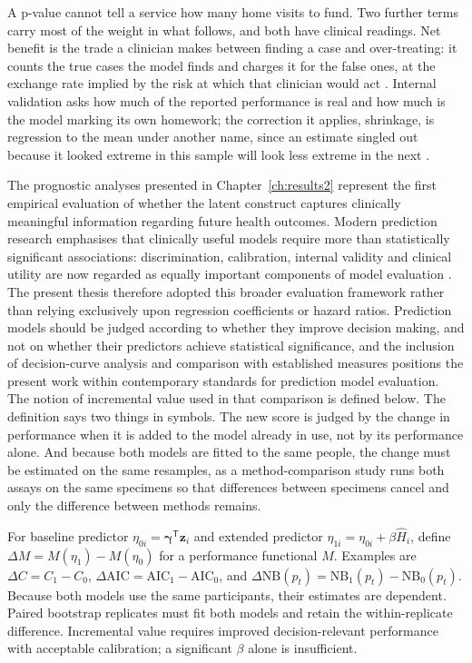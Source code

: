 A p-value cannot tell a service how many home visits to fund. Two further terms
carry most of the weight in what follows, and both have clinical readings. Net
benefit is the trade a clinician makes between finding a case and over-treating:
it counts the true cases the model finds and charges it for the false ones, at
the exchange rate implied by the risk at which that clinician would act
\citep{vickers_elkin_2006}. Internal validation asks how much of the reported
performance is real and how much is the model marking its own homework; the
correction it applies, shrinkage, is regression to the mean under another name,
since an estimate singled out because it looked extreme in this sample will look
less extreme in the next \citep{harrell_1996,steyerberg_2019}.

The prognostic analyses presented in Chapter~\ref{ch:results2} represent the first empirical evaluation of whether the latent construct captures clinically meaningful information regarding future health outcomes. Modern prediction research emphasises that clinically useful models require more than statistically significant associations: discrimination, calibration, internal validity and clinical utility are now regarded as equally important components of model evaluation \citep{steyerberg_2019,vancalster_2019}. The present thesis therefore adopted this broader evaluation framework rather than relying exclusively upon regression coefficients or hazard ratios. Prediction models should be judged according to whether they improve decision making, and not on whether their predictors achieve statistical significance, and the inclusion of decision-curve analysis and comparison with established measures positions the present work within contemporary standards for prediction model evaluation. The notion of incremental value used in that comparison is defined below. The definition says two things in symbols. The new score is judged by the change in performance when it is added to the model already in use, not by its performance alone. And because both models are fitted to the same people, the change must be estimated on the same resamples, as a method-comparison study runs both assays on the same specimens so that differences between specimens cancel and only the difference between methods remains.

\begin{derivation}
\label{der:incremental}
For baseline predictor $\eta_{0i}=\boldsymbol\gamma^{\mathsf T}\mathbf z_i$ and
extended predictor $\eta_{1i}=\eta_{0i}+\beta\widehat H_i$, define
$\Delta M=M(\eta_1)-M(\eta_0)$ for a performance functional $M$. Examples are
$\Delta C=C_1-C_0$, $\Delta\mathrm{AIC}=\mathrm{AIC}_1-\mathrm{AIC}_0$, and
$\Delta\mathrm{NB}(p_t)=\mathrm{NB}_1(p_t)-\mathrm{NB}_0(p_t)$. Because both
models use the same participants, their estimates are dependent. Paired bootstrap \citep{efron_tibshirani_1993,steyerberg_2019}
replicates must fit both models and retain the within-replicate difference.
Incremental value requires improved decision-relevant performance with acceptable
calibration; a significant $\beta$ alone is insufficient.
\end{derivation}

